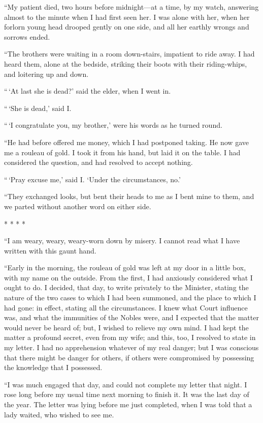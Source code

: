 ``My patient died, two hours before midnight---at a time, by my watch,
answering almost to the minute when I had first seen her.  I was
alone with her, when her forlorn young head drooped gently on one
side, and all her earthly wrongs and sorrows ended.

``The brothers were waiting in a room down-stairs, impatient to ride
away.  I had heard them, alone at the bedside, striking their boots
with their riding-whips, and loitering up and down.

``\,`At last she is dead?' said the elder, when I went in.

``\,`She is dead,' said I.

``\,`I congratulate you, my brother,' were his words as he turned round.

``He had before offered me money, which I had postponed taking.  He
now gave me a rouleau of gold.  I took it from his hand, but laid it
on the table.  I had considered the question, and had resolved to
accept nothing.

``\,`Pray excuse me,' said I. `Under the circumstances, no.'

``They exchanged looks, but bent their heads to me as I bent mine to
them, and we parted without another word on either side.

* * * *

``I am weary, weary, weary-worn down by misery.  I cannot read what I
have written with this gaunt hand.

``Early in the morning, the rouleau of gold was left at my door in a
little box, with my name on the outside.  From the first, I had
anxiously considered what I ought to do.  I decided, that day, to
write privately to the Minister, stating the nature of the two cases
to which I had been summoned, and the place to which I had gone:  in
effect, stating all the circumstances.  I knew what Court influence
was, and what the immunities of the Nobles were, and I expected that
the matter would never be heard of; but, I wished to relieve my own
mind.  I had kept the matter a profound secret, even from my wife;
and this, too, I resolved to state in my letter.  I had no apprehension
whatever of my real danger; but I was conscious that there might be
danger for others, if others were compromised by possessing the
knowledge that I possessed.

``I was much engaged that day, and could not complete my letter that
night.  I rose long before my usual time next morning to finish it.
It was the last day of the year.  The letter was lying before me just
completed, when I was told that a lady waited, who wished to see me.

